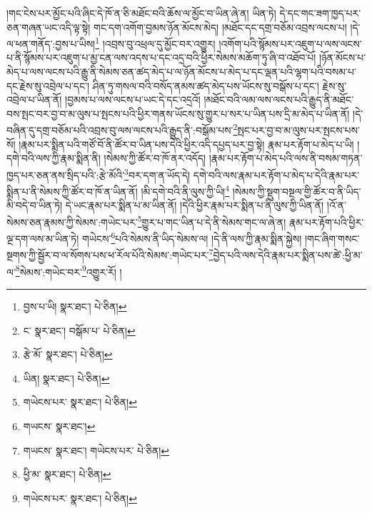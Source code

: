 །གང་ངེས་པར་མྱོང་པའི་ཞིང་དེ་ཁོ་ན་ཅི་མཐོང་བའི་ཆོས་ལ་མྱོང་བ་ཡིན་ཞེ་ན། ཡིན་ཏེ། དེ་དང་གང་ཟག་ཁྱད་པར་ཅན་གཞན་ཡང་འདི་ལྟ་སྟེ། གང་དག་འགོག་བྱམས་ཉོན་མོངས་མེད། །མཐོང་དང་དགྲ་བཅོམ་འབྲས་ལངས་པ། །དེ་ལ་ཕན་གནོད་:བྱས་པ་ཡིས།\footnote{བྱས་པ་ཡི།  སྣར་ཐང་།  པེ་ཅིན། } །འབྲས་བུ་འཕྲལ་དུ་མྱོང་བར་འགྱུར། །འགོག་པའི་སྙོམས་པར་འཇུག་པ་ལས་ལངས་པ་ནི་སྙོམས་པར་འཇུག་པ་མྱ་ངན་ལས་འདས་པ་དང་འདྲ་བའི་ཕྱིར་སེམས་མཆོག་ཏུ་ཞི་བ་འཐོབ་པོ། །ཉོན་མོངས་པ་མེད་པ་ལས་ལངས་པའི་རྒྱུ་ནི་སེམས་ཅན་ཚད་མེད་པ་ལ་ཉོན་མོངས་པ་མེད་པ་དང་ལྡན་པའི་ལྷག་པའི་བསམ་པ་དང་རྗེས་སུ་འབྲེལ་པ་དང་། ཤིན་ཏུ་གསལ་བའི་བསོད་ནམས་ཚད་མེད་པས་ཡོངས་སུ་བསྒོས་པ་དང་། རྗེས་སུ་འབྲེལ་པ་ཡིན་ནོ། །བྱམས་པ་ལས་ལངས་པ་ཡང་དེ་དང་འདྲའོ། །མཐོང་བའི་ལམ་ལས་ལངས་པའི་རྒྱུད་ནི་མཐོང་བས་སྤང་བར་བྱ་བ་མ་ལུས་པ་སྤངས་པའི་ཕྱིར་གནས་ཡོངས་སུ་གྱུར་པ་སར་པ་ཡིན་པས་དྲི་མ་མེད་པ་ཡིན་ནོ། །དེ་བཞིན་དུ་དགྲ་བཅོམ་པའི་འབྲས་བུ་ལས་ལངས་པའི་རྒྱུད་ནི་:བསྒོམ་པས་\footnote{ང་  སྣར་ཐང་། བསྒོམ་པ་  པེ་ཅིན། }སྤང་པར་བྱ་བ་མ་ལུས་པར་སྤངས་པས་སོ། །རྣམ་པར་སྨིན་པའི་གཙོ་བོ་ནི་ཚོར་བ་ཡིན་པས་དེའི་ཕྱིར་འདི་དཔྱད་པར་བྱ་སྟེ། རྣམ་པར་རྟོག་པ་མེད་པ་ཡི། །དགེ་བའི་ལས་ཀྱི་རྣམ་སྨིན་ནི། །སེམས་ཀྱི་ཚོར་བ་ཁོ་ནར་འདོད། །རྣམ་པར་རྟོག་པ་མེད་པའི་ལས་ནི་བསམ་གཏན་ཁྱད་པར་ཅན་ནས་སྲིད་པའི་:རྩེ་མོའི་\footnote{རྩེ་མོ་  སྣར་ཐང་།  པེ་ཅིན། }བར་དག་ན་ཡོད་དེ། དགེ་བའི་ལས་རྣམ་པར་རྟོག་པ་མེད་པ་དེའི་རྣམ་པར་སྨིན་པ་ནི་སེམས་ཀྱི་ཚོར་བ་ཁོ་ན་ཡིན་ནོ། །མི་དགེ་བའི་ནི་ལུས་ཀྱི་ཡི།\footnote{ཡིན།  སྣར་ཐང་།  པེ་ཅིན། } །སེམས་ཀྱི་སྡུག་བསྔལ་གྱི་ཚོར་བ་ནི་ཡིད་མི་བདེ་བ་ཡིན་ཏེ། དེ་ཡང་རྣམ་པར་སྨིན་པ་མ་ཡིན་ནོ། །དེའི་ཕྱིར་རྣམ་པར་སྨིན་པ་ནི་ལུས་ཀྱི་ཡིན་ནོ། །འོ་ན་སེམས་ཅན་རྣམས་ཀྱི་སེམས་:གཡེང་པར་\footnote{གཡེངས་པར་  སྣར་ཐང་།  པེ་ཅིན། }གྱུར་པ་གང་ཡིན་པ་དེ་ནི་སེམས་གང་ལ་ཞེ་ན། རྣམ་པར་རྟོག་པའི་ཕྱིར་ལྔ་དག་ལས་མ་ཡིན་ཏེ། གཡེངས་\footnote{གཡངས་  སྣར་ཐང་། }པའི་སེམས་ནི་ཡིད་སེམས་ལ། །དེ་ནི་ལས་ཀྱི་རྣམ་སྨིན་སྐྱེས། །གང་ཞིག་གསང་སྔགས་ཀྱི་སྦྱོར་བ་ལ་སོགས་པས་ཕ་རོལ་པོའི་སེམས་:གཡེང་པར་\footnote{གཡངས་  སྣར་ཐང་། གཡེངས་པར་  པེ་ཅིན། }བྱེད་པའི་ལས་དེའི་རྣམ་པར་སྨིན་པས་ཚེ་:ཕྱི་མ་ལ་\footnote{ཕྱི་མ་  སྣར་ཐང་།  པེ་ཅིན། }སེམས་:གཡེང་བར་\footnote{གཡེངས་པར་  སྣར་ཐང་།  པེ་ཅིན། }འགྱུར་རོ། །
